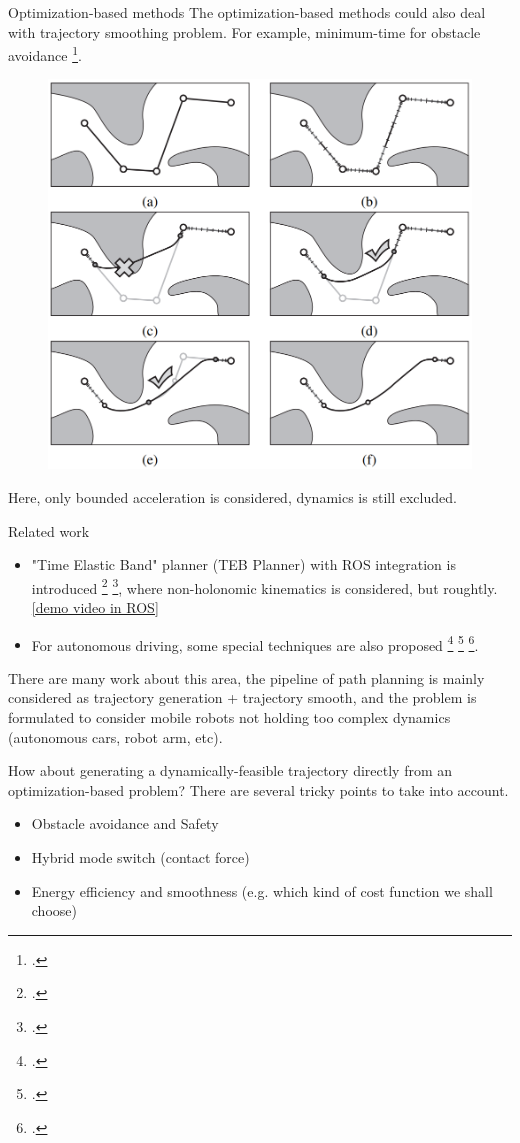 \documentclass{beamer}
\begin{document}
\begin{frame}{Optimization-based methods}
	The optimization-based methods could also deal with trajectory smoothing problem. For example, minimum-time for obstacle avoidance \footcite{hauser2010fast}.
	\begin{figure}
		\includegraphics[width=0.4\linewidth]{figures/trajectory-smooth-optimal-bounded-acceleration.png}
	\end{figure}
	Here, only bounded acceleration is considered, dynamics is still excluded.
\end{frame}

\begin{frame}{Related work}
	\begin{itemize}
		\item "Time Elastic Band" planner (TEB Planner) with ROS integration is introduced \footcite{rosmann2012trajectory} \footcite{rosmann2013efficient}, where non-holonomic kinematics is considered, but roughtly. \href{https://www.youtube.com/watch?v=e1Bw6JOgHME&feature=emb_title}{[demo video in ROS]}
		\item For autonomous driving, some special techniques are also proposed \footcite{dolgov2010path} \footcite{ziegler2014trajectory} \footcite{gu2012road}.
	\end{itemize}
\end{frame}

\begin{frame}
	There are many work about this area, the pipeline of path planning is mainly considered as trajectory generation + trajectory smooth, and the problem is formulated to consider mobile robots not holding too complex dynamics (autonomous cars, robot arm, etc).
	
	\vspace{\baselineskip}
	How about generating a dynamically-feasible trajectory directly from an optimization-based problem? There are several tricky points to take into account.
	\begin{itemize}
		\item Obstacle avoidance and Safety
		\item Hybrid mode switch (contact force)
		\item Energy efficiency and smoothness (e.g. which kind of cost function we shall choose)
	\end{itemize}
\end{frame}
\end{document}
